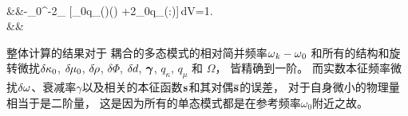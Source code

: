 {{ \nonumber \\
&&\mbox{}-\invpi\om_0^{-2}\int_{\subearth}
[\kappa_0q_{\kappa}(\bdel\cdot\overline{\bs})(\bdel\cdot\bs)
+2\mu_0q_{\mu}(\overline{\bd}\!:\!\bd)]\,dV=1. \nonumber \\
&&\mbox{}
\ena

整体计算的结果对于
耦合的多态模式的相对简并频率$\mbox{$\omega$}_k-\mbox{$\omega$}_0$
和所有的结构和旋转微扰$\delta\hspace{-0.1 mm}\kappa_0$,
$\delta\hspace{-0.2 mm}\mu_0$, $\delta\hspace{-0.2 mm}\rho$,
$\delta\Phi$, $\delta\hspace{-0.1 mm}d$, $\mbox{\boldmath $\bf \gamma$}$,
$q_{\kappa}$, $q_{\mu}$ 和 $\Omega$，
皆精确到一阶。
而实数本征频率微扰$\delta\mbox{$\omega$}$、衰减率$\gamma$以及相关的本征函数$\mbox{${\bf s}$}$和其对偶$\overline{\mbox{${\bf s}$}}$的误差，
对于自身微小的物理量相当于是二阶量，
这是因为所有的单态模式都是在参考频率$\omega_0$附近之故。


}}
